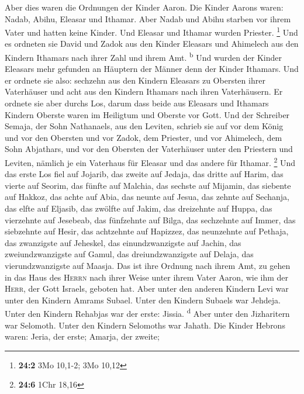  Aber dies waren die Ordnungen der Kinder Aaron. Die
Kinder Aarons waren: Nadab, Abihu, Eleasar und Ithamar. 
Aber Nadab und Abihu starben vor ihrem Vater und hatten keine Kinder.
Und Eleasar und Ithamar wurden Priester. \footnote{\textbf{24:2} 3Mo
  10,1-2; 3Mo 10,12}  Und es ordneten sie David und Zadok
aus den Kinder Eleasars und Ahimelech aus den Kindern Ithamars nach
ihrer Zahl und ihrem Amt. \textsuperscript{b}  Und wurden
der Kinder Eleasars mehr gefunden an Häuptern der Männer denn der Kinder
Ithamars. Und er ordnete sie also: sechzehn aus den Kindern Eleasars zu
Obersten ihrer Vaterhäuser und acht aus den Kindern Ithamars nach ihren
Vaterhäusern.  Er ordnete sie aber durchs Los, darum dass
beide aus Eleasars und Ithamars Kindern Oberste waren im Heiligtum und
Oberste vor Gott.  Und der Schreiber Semaja, der Sohn
Nathanaels, aus den Leviten, schrieb sie auf vor dem König und vor den
Obersten und vor Zadok, dem Priester, und vor Ahimelech, dem Sohn
Abjathars, und vor den Obersten der Vaterhäuser unter den Priestern und
Leviten, nämlich je ein Vaterhaus für Eleasar und das andere für
Ithamar. \footnote{\textbf{24:6} 1Chr 18,16}  Und das
erste Los fiel auf Jojarib, das zweite auf Jedaja,  das
dritte auf Harim, das vierte auf Seorim,  das fünfte auf
Malchia, das sechste auf Mijamin,  das siebente auf
Hakkoz, das achte auf Abia,  das neunte auf Jesua, das
zehnte auf Sechanja,  das elfte auf Eljasib, das zwölfte
auf Jakim,  das dreizehnte auf Huppa, das vierzehnte auf
Jesebeab,  das fünfzehnte auf Bilga, das sechzehnte auf
Immer,  das siebzehnte auf Hesir, das achtzehnte auf
Hapizzez,  das neunzehnte auf Pethaja, das zwanzigste auf
Jeheskel,  das einundzwanzigste auf Jachin, das
zweiundzwanzigste auf Gamul,  das dreiundzwanzigste auf
Delaja, das vierundzwanzigste auf Maasja.  Das ist ihre
Ordnung nach ihrem Amt, zu gehen in das Haus des \textsc{Herrn} nach
ihrer Weise unter ihrem Vater Aaron, wie ihm der \textsc{Herr}, der Gott
Israels, geboten hat.  Aber unter den anderen Kindern
Levi war unter den Kindern Amrams Subael. Unter den Kindern Subaels war
Jehdeja.  Unter den Kindern Rehabjas war der erste:
Jissia. \textsuperscript{d}  Aber unter den Jizharitern
war Selomoth. Unter den Kindern Selomoths war Jahath. 
Die Kinder Hebrons waren: Jeria, der erste; Amarja, der zweite;

